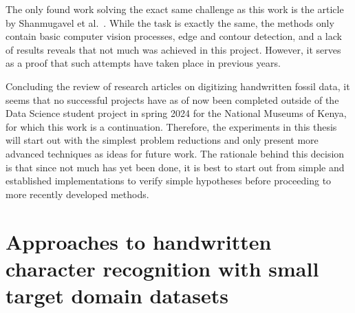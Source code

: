 \documentclass[english,twoside,openright]{UH_DS_MSc}
\begin{document}
The only found work solving the exact same challenge as this work is the article by Shanmugavel et al.~\cite{shanmugavelHandwrittenOpticalCharacter2018}.
While the task is exactly the same, the methods only contain basic computer 
vision processes, edge and contour detection, and a lack of results reveals that not much was achieved in 
this project. However, it serves as a proof that such attempts have taken place in previous years.

Concluding the review of research articles on digitizing handwritten fossil data, it seems that no successful projects
have as of now been completed outside of the Data Science student project in spring 2024 for the National 
Museums of Kenya, for which this work is a continuation. Therefore, the experiments in this thesis will 
start out with the simplest problem reductions and only present more advanced techniques as ideas for future work.
The rationale behind this decision is that since not much has yet been done, it is best to start out from 
simple and established implementations to verify simple hypotheses before proceeding to more recently developed methods.

\section{Approaches to handwritten character recognition with small target domain datasets}
\label{sect:same_solution}

\end{document}
